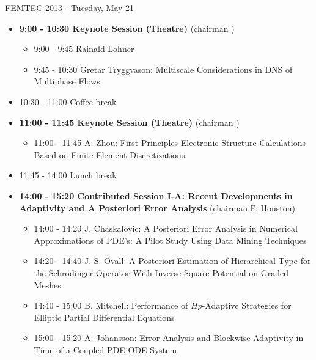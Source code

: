 \documentclass[10pt, A4]{article}%
\begin{document}
\newpage

\centerline{\huge FEMTEC 2013 - Tuesday, May 21}
\vspace{4mm}

\begin{itemize}    
  \item {\bf 9:00 - 10:30 Keynote Session (Theatre)} (chairman ) 
  \begin{itemize}
    \item 9:00 - 9:45 {Rainald Lohner}
    \item 9:45 - 10:30 {Gretar Tryggvason}: {Multiscale Considerations in DNS of Multiphase Flows}
  \end{itemize}
  \item 10:30 - 11:00 Coffee break
  \item {\bf 11:00 - 11:45 Keynote Session (Theatre)} (chairman ) 
  \begin{itemize}
    \item 11:00 - 11:45 {A. Zhou}: {First-Principles Electronic Structure Calculations Based on Finite Element Discretizations}
  \end{itemize}
  \item 11:45 - 14:00 Lunch break      
  \item {\bf 14:00 - 15:20 Contributed Session I-A: Recent Developments in Adaptivity and A Posteriori Error Analysis} (chairman P. Houston) 
  \begin{itemize}
    \item 14:00 - 14:20 {J. Chaskalovic}: {A Posteriori Error Analysis in Numerical Approximations of PDE's: A Pilot Study Using Data Mining Techniques}
    \item 14:20 - 14:40 {J. S. Ovall}: {A Posteriori Estimation of Hierarchical Type for the  Schrodinger Operator With Inverse Square Potential on Graded Meshes}
    \item 14:40 - 15:00 {B. Mitchell}: {Performance of $Hp$-Adaptive Strategies for Elliptic Partial Differential Equations}
    \item 15:00 - 15:20 {A. Johansson}: {Error Analysis and Blockwise Adaptivity in Time of a Coupled PDE-ODE System} 


\end{itemize}
\end{itemize}
\end{document}
